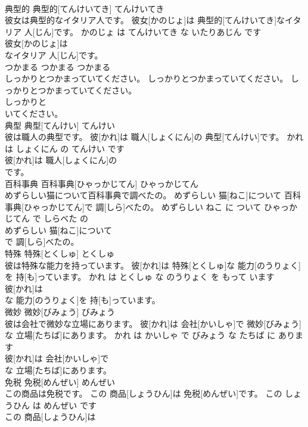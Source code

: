 \documentclass[8pt]{extreport}
\begin{document}
\begin{CJK}{UTF8}{min}
\\	典型的	典型的[てんけいてき]	てんけいてき	
\\	彼女は典型的なイタリア人です。	彼女[かのじょ]は 典型的[てんけいてき]なイタリア 人[じん]です。	かのじょ は てんけいてき な いたりあじん です	
\\	彼女[かのじょ]は
\\	なイタリア 人[じん]です。			
\\	つかまる	つかまる	つかまる	
\\	しっかりとつかまっていてください。	しっかりとつかまっていてください。	しっかりとつかまっていてください。	
\\	しっかりと
\\	いてください。			
\\	典型	典型[てんけい]	てんけい	
\\	彼は職人の典型です。	彼[かれ]は 職人[しょくにん]の 典型[てんけい]です。	かれ は しょくにん の てんけい です	
\\	彼[かれ]は 職人[しょくにん]の
\\	です。			
\\	百科事典	百科事典[ひゃっかじてん]	ひゃっかじてん	
\\	めずらしい猫について百科事典で調べたの。	めずらしい 猫[ねこ]について 百科事典[ひゃっかじてん]で 調[しら]べたの。	めずらしい ねこ に ついて ひゃっかじてん で しらべた の	
\\	めずらしい 猫[ねこ]について
\\	で 調[しら]べたの。			
\\	特殊	特殊[とくしゅ]	とくしゅ	
\\	彼は特殊な能力を持っています。	彼[かれ]は 特殊[とくしゅ]な 能力[のうりょく]を 持[も]っています。	かれ は とくしゅ な のうりょく を もって います	
\\	彼[かれ]は
\\	な 能力[のうりょく]を 持[も]っています。			
\\	微妙	微妙[びみょう]	びみょう	
\\	彼は会社で微妙な立場にあります。	彼[かれ]は 会社[かいしゃ]で 微妙[びみょう]な 立場[たちば]にあります。	かれ は かいしゃ で びみょう な たちば に あります	
\\	彼[かれ]は 会社[かいしゃ]で
\\	な 立場[たちば]にあります。			
\\	免税	免税[めんぜい]	めんぜい	
\\	この商品は免税です。	この 商品[しょうひん]は 免税[めんぜい]です。	この しょうひん は めんぜい です	
\\	この 商品[しょうひん]は

\end{CJK}
\end{document}
